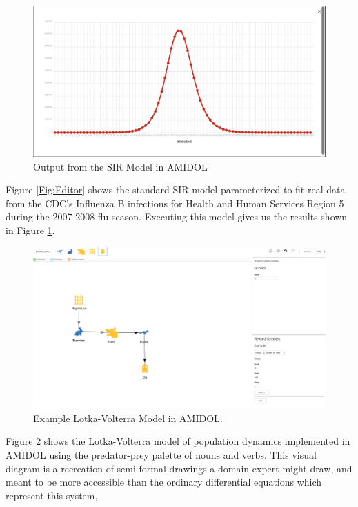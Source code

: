 \documentclass[11pt]{article}
\newcommand{\amidol}{\textsc{AMIDOL}}
\begin{document}
\begin{figure}
  \includegraphics[width=\textwidth]{figs/SIR-output.png}
\caption{Output from the SIR Model in \amidol{}}
\label{Fig:SIROut}
\end{figure}


Figure \ref{Fig:Editor} shows the standard SIR model parameterized to fit real data from the CDC's Influenza B infections for Health and Human Services Region 5 during the 2007-2008 flu season.  Executing this model gives us the results shown in Figure \ref{Fig:SIROut}.

\begin{figure}
\includegraphics[width=\textwidth]{figs/Lotka-Volterra.png}
\caption{Example Lotka-Volterra Model in \amidol{}.}
\label{Fig:Lotka}
\end{figure}

Figure \ref{Fig:Lotka} shows the Lotka-Volterra model of population dynamics implemented in \amidol{} using the predator-prey palette of nouns and verbs.  This visual diagram is a recreation of semi-formal drawings a domain expert might draw, and meant to be more accessible than the ordinary differential equations which represent this system,
\end{document}
